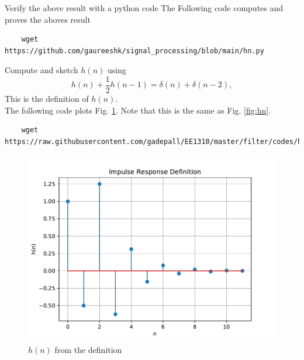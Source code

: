 \documentclass[journal,12pt,twocolumn]{IEEEtran}
\renewcommand\thesection{\arabic{section}}
\begin{document}
\begin{enumerate}[label=\thesection.\arabic*]
{%
\item Verify the above result with a python code
			\solution The Following code computes and proves the aboves result
\begin{lstlisting}
	wget https://github.com/gaureeshk/signal_processing/blob/main/hn.py
\end{lstlisting}
\item 
Compute and sketch $h(n)$ using 
\begin{equation}
	\label{eq:iir_filter_h}
	h(n) + \frac{1}{2}h(n-1) = \delta(n) + \delta(n-2), 
\end{equation}
%
This is the definition of $h(n)$.
\\
\solution The following code plots Fig. \ref{fig:hndef}. Note that this is the same as Fig. 
\ref{fig:hn}. 
%
\begin{lstlisting}
	wget https://raw.githubusercontent.com/gadepall/EE1310/master/filter/codes/hndef.py
\end{lstlisting}
\begin{figure}[!ht]
	\centering
	\includegraphics[width=\columnwidth]{./figs/hndef}
	\caption{$h(n)$ from the definition}
	\label{fig:hndef}
\end{figure}
%


}
\end{enumerate}
\end{document}
